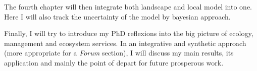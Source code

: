 The fourth chapter will then integrate both landscape and local model into one. Here I will also track the uncertainty of the model by bayesian approach.

Finally, I will try to introduce my PhD reflexions into the big picture of ecology, management and ecosystem services. In an integrative and synthetic approach (more appropriate for a \textit{Forum} section), I will discuss my main results, its application and mainly the point of depart for future prosperous work.


\clearpage



